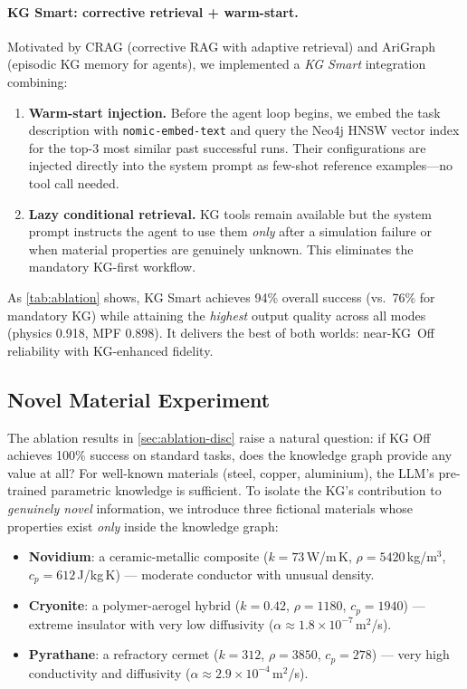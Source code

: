 \documentclass[twocolumn]{article}
\begin{document}
\paragraph{KG Smart: corrective retrieval + warm-start.}
Motivated by CRAG \citep{yan2024crag} (corrective RAG with adaptive
retrieval) and AriGraph \citep{arigraph2024} (episodic KG memory for
agents), we implemented a \emph{KG Smart} integration combining:
\begin{enumerate}
  \item \textbf{Warm-start injection.} Before the agent loop begins, we embed
        the task description with \texttt{nomic-embed-text} and query the Neo4j
        HNSW vector index for the top-3 most similar past successful runs.
        Their configurations are injected directly into the system prompt as
        few-shot reference examples---no tool call needed.
  \item \textbf{Lazy conditional retrieval.} KG tools remain available but the
        system prompt instructs the agent to use them \emph{only}
        after a simulation failure or when material properties are genuinely
        unknown.  This eliminates the mandatory KG-first workflow.
\end{enumerate}

As \cref{tab:ablation} shows, KG Smart achieves 94\% overall success
(vs.\ 76\% for mandatory KG) while attaining the \emph{highest} output
quality across all modes (physics 0.918, MPF 0.898).  It delivers the
best of both worlds: near-KG~Off reliability with KG-enhanced fidelity.

\subsection{Novel Material Experiment}
\label{sec:novidium}

The ablation results in \cref{sec:ablation-disc} raise a natural
question: if KG Off achieves 100\% success on standard tasks, does
the knowledge graph provide any value at all?
For well-known materials (steel, copper, aluminium), the LLM's
pre-trained parametric knowledge is sufficient.  To isolate the KG's
contribution to \emph{genuinely novel} information, we introduce
three fictional materials whose properties exist \emph{only} inside
the knowledge graph:

\begin{itemize}
  \item \textbf{Novidium}: a ceramic-metallic composite ($k{=}73$\,W/m\,K,
        $\rho{=}5420$\,kg/m$^3$, $c_p{=}612$\,J/kg\,K) ---
        moderate conductor with unusual density.
  \item \textbf{Cryonite}: a polymer-aerogel hybrid ($k{=}0.42$,
        $\rho{=}1180$, $c_p{=}1940$) --- extreme insulator with
        very low diffusivity ($\alpha \approx 1.8{\times}10^{-7}$\,m$^2$/s).
  \item \textbf{Pyrathane}: a refractory cermet ($k{=}312$,
        $\rho{=}3850$, $c_p{=}278$) --- very high conductivity
        and diffusivity ($\alpha \approx 2.9{\times}10^{-4}$\,m$^2$/s).
\end{itemize}
\end{document}

